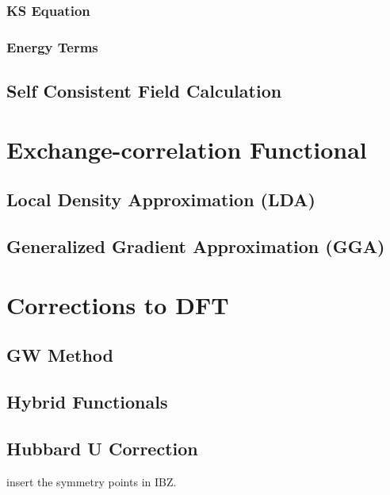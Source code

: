         \subsubsection{KS Equation}
        \subsubsection{Energy Terms}
    \subsection{Self Consistent Field Calculation}
\section{Exchange-correlation Functional}
    \subsection{Local Density Approximation (LDA)}
    \subsection{Generalized Gradient Approximation (GGA)}

\section{Corrections to DFT}
    \subsection{GW Method}
    \subsection{Hybrid Functionals}
    \subsection{Hubbard U Correction}

    {\color{red} insert the symmetry points in IBZ.}


